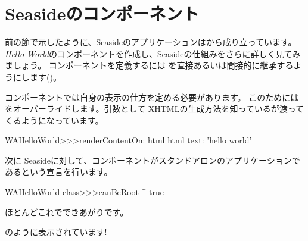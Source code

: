 \documentclass[a4paper,10pt,twoside]{book}
\begin{document}
\section{Seasideのコンポーネント}


前の節で示したように、Seasideのアプリケーションは\emph{}から成り立っています。
\emph{Hello World}のコンポーネントを作成し、Seasideの仕組みをさらに詳しく見てみましょう。
コンポーネントを定義するには を直接あるいは間接的に継承するようにします()。


コンポーネントでは自身の表示の仕方を定める必要があります。
このためにはをオーバーライドします。引数として XHTMLの生成方法を知っているが渡ってくるようになっています。

\begin{code}{}
WAHelloWorld>>>renderContentOn: html
	html text: 'hello world'
\end{code}

\noindent
次に Seasideに対して、コンポーネントがスタンドアロンのアプリケーションであるという宣言を行います。


\begin{code}{}
WAHelloWorld class>>>canBeRoot
	^ true
\end{code}

\noindent
ほとんどこれでできあがりです。

のように表示されています!
\end{document}
